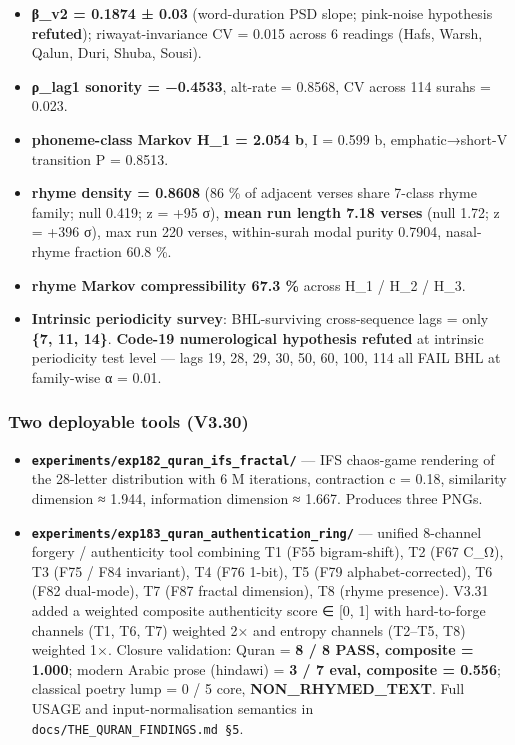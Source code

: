 \documentclass[
]{article}
\providecommand{\tightlist}{%
  \setlength{\itemsep}{0pt}\setlength{\parskip}{0pt}}
\begin{document}
\begin{itemize}
\tightlist
\item
  \textbf{β\_v2 = 0.1874 ± 0.03} (word-duration PSD slope; pink-noise
  hypothesis \textbf{refuted}); riwayat-invariance CV = 0.015 across 6
  readings (Hafs, Warsh, Qalun, Duri, Shuba, Sousi).
\item
  \textbf{ρ\_lag1 sonority = −0.4533}, alt-rate = 0.8568, CV across 114
  surahs = 0.023.
\item
  \textbf{phoneme-class Markov H\_1 = 2.054 b}, I = 0.599 b,
  emphatic→short-V transition P = 0.8513.
\item
  \textbf{rhyme density = 0.8608} (86 \% of adjacent verses share
  7-class rhyme family; null 0.419; z = +95 σ), \textbf{mean run length
  7.18 verses} (null 1.72; z = +396 σ), max run 220 verses, within-surah
  modal purity 0.7904, nasal-rhyme fraction 60.8 \%.
\item
  \textbf{rhyme Markov compressibility 67.3 \%} across H\_1 / H\_2 /
  H\_3.
\item
  \textbf{Intrinsic periodicity survey}: BHL-surviving cross-sequence
  lags = only \textbf{\{7, 11, 14\}}. \textbf{Code-19 numerological
  hypothesis refuted} at intrinsic periodicity test level --- lags 19,
  28, 29, 30, 50, 60, 100, 114 all FAIL BHL at family-wise α = 0.01.
\end{itemize}

\subsubsection{Two deployable tools
(V3.30)}\label{two-deployable-tools-v3.30}

\begin{itemize}
\tightlist
\item
  \textbf{\texttt{experiments/exp182\_quran\_ifs\_fractal/}} --- IFS
  chaos-game rendering of the 28-letter distribution with 6 M
  iterations, contraction c = 0.18, similarity dimension ≈ 1.944,
  information dimension ≈ 1.667. Produces three PNGs.
\item
  \textbf{\texttt{experiments/exp183\_quran\_authentication\_ring/}} ---
  unified 8-channel forgery / authenticity tool combining T1 (F55
  bigram-shift), T2 (F67 C\_Ω), T3 (F75 / F84 invariant), T4 (F76
  1-bit), T5 (F79 alphabet-corrected), T6 (F82 dual-mode), T7 (F87
  fractal dimension), T8 (rhyme presence). V3.31 added a weighted
  composite authenticity score ∈ {[}0, 1{]} with hard-to-forge channels
  (T1, T6, T7) weighted 2× and entropy channels (T2--T5, T8) weighted
  1×. Closure validation: Quran = \textbf{8 / 8 PASS, composite =
  1.000}; modern Arabic prose (hindawi) = \textbf{3 / 7 eval, composite
  = 0.556}; classical poetry lump = 0 / 5 core,
  \textbf{NON\_RHYMED\_TEXT}. Full USAGE and input-normalisation
  semantics in \texttt{docs/THE\_QURAN\_FINDINGS.md\ §5}.
\end{itemize}
\end{document}
